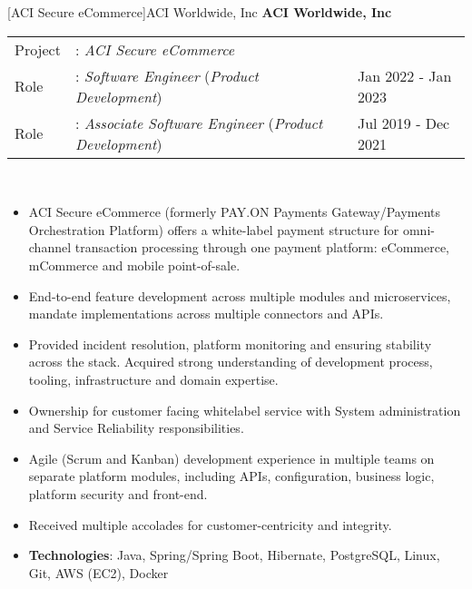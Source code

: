 \documentclass[a4paper]{article}
\begin{document}
[ACI Secure eCommerce]{ACI Worldwide, Inc}
\textbf{ACI Worldwide, Inc} \\
\noindent
\begin{tabularx}{\textwidth}{ l l>{\raggedleft\arraybackslash}X}
  Project & : \textit{ACI Secure eCommerce} & \\
  Role & : \textit{Software Engineer} (\textit{Product Development})  & Jan 2022 - Jan 2023 \\
  Role & : \textit{Associate Software Engineer} (\textit{Product Development})  & Jul 2019 - Dec 2021 \\
\end{tabularx}
\textbf{} \\
\begin{itemize} \itemsep 1pt
  \item ACI Secure eCommerce (formerly PAY.ON Payments Gateway/Payments Orchestration Platform) offers a white-label payment structure for omni-channel transaction processing through one payment platform: eCommerce, mCommerce and mobile point-of-sale.
  \item End-to-end feature development across multiple modules and microservices, mandate implementations across multiple connectors and APIs.
  \item Provided incident resolution, platform monitoring and ensuring stability across the stack. Acquired strong understanding of development process, tooling, infrastructure and domain expertise.
  \item Ownership for customer facing whitelabel service with System administration and Service Reliability responsibilities.
  \item Agile (Scrum and Kanban) development experience in multiple teams on separate platform modules, including APIs, configuration, business logic, platform security and front-end.
  \item Received multiple accolades for customer-centricity and integrity.
  \item \textbf{Technologies}: Java, Spring/Spring Boot, Hibernate, PostgreSQL, Linux, Git, AWS (EC2), Docker
\end{itemize}

\end{document}
